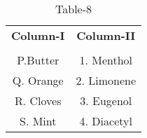 \begin{table}[htbp]
  \centering
  \caption{Table-8}
  \label{table8}
  \begin{tabular}{cc}
  \textbf{Column-I} & \textbf{Column-II} \\ \\
    P.Butter  & 1. Menthol  \\
    Q. Orange & 2. Limonene \\
    R. Cloves & 3. Eugenol \\
    S. Mint & 4. Diacetyl\\
  \end{tabular}
\end{table}
